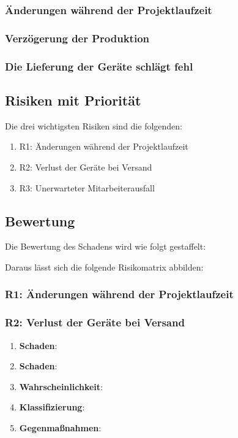 \subsubsection{Änderungen während der Projektlaufzeit}

\subsubsection{Verzögerung der Produktion}

\subsubsection{Die Lieferung der Geräte schlägt fehl}

\subsection{Risiken mit Priorität} %

Die drei wichtigsten Risiken sind die folgenden:
\begin{enumerate}
	\item R1: Änderungen während der Projektlaufzeit
	\item R2: Verlust der Geräte bei Versand
	\item R3: Unerwarteter Mitarbeiterausfall
\end{enumerate}


\subsection{Bewertung } %
Die Bewertung des Schadens wird wie folgt gestaffelt:	


Daraus lässt sich die folgende Risikomatrix abbilden:


\subsubsection{R1: Änderungen während der Projektlaufzeit}

\subsubsection{R2: Verlust der Geräte bei Versand}
\begin{enumerate}
	\item \textbf{Schaden}:
		\item \textbf{Schaden}:
			\item \textbf{Wahrscheinlichkeit}:
				\item \textbf{Klassifizierung}:
					\item \textbf{Gegenmaßnahmen}:
\end{enumerate}
